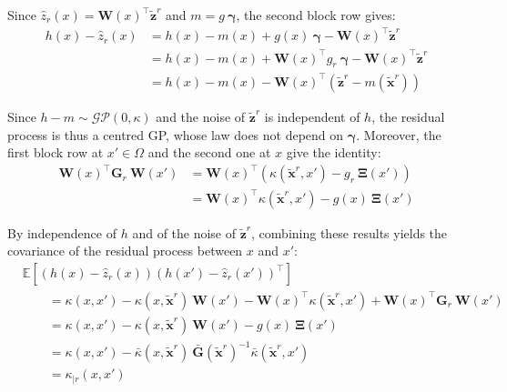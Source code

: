 Since $\hat{z}_r(x)=\mathbf{W}(x)^\top\tilde{\mathbf{z}}^r$ and $m=g\:\boldsymbol{\gamma}$, the second block row gives:
\begin{equation}
	\begin{aligned}
	h(x)-\hat{z}_r(x)&=h(x)-m(x)+g(x)\:\boldsymbol{\gamma}-\mathbf{W}(x)^\top\tilde{\mathbf{z}}^r\\
	&=h(x)-m(x)+\mathbf{W}(x)^\top g_r\:\boldsymbol{\gamma}-\mathbf{W}(x)^\top\tilde{\mathbf{z}}^r\\
	&=h(x)-m(x)-\mathbf{W}(x)^\top\left(\tilde{\mathbf{z}}^r-m(\tilde{\mathbf{x}}^r)\right)
	\end{aligned}
\end{equation}

Since $h-m\sim\mathcal{GP}(0,\kappa)$ and the noise of $\tilde{\mathbf{z}}^r$ is independent of $h$, the residual process is thus a centred GP, whose law does not depend on $\boldsymbol{\gamma}$. Moreover, the first block row at $x'\in\Omega$ and the second one at $x$ give the identity:
\begin{equation}
	\begin{aligned}
	\mathbf{W}(x)^\top \mathbf{G}_r\:\mathbf{W}(x')&=\mathbf{W}(x)^\top\left(\kappa(\tilde{\mathbf{x}}^r,x')-g_r\:\boldsymbol{\Xi}(x')\right)\\
	&=\mathbf{W}(x)^\top \kappa(\tilde{\mathbf{x}}^r,x')-g(x)\:\boldsymbol{\Xi}(x')
	\end{aligned}
\end{equation}

By independence of $h$ and of the noise of $\tilde{\mathbf{z}}^r$, combining these results yields the covariance of the residual process between $x$ and $x'$:
\begin{equation}
	\begin{aligned}
	&\mathbb{E}\left[\left(h(x)-\hat{z}_r(x)\right)\left(h(x')-\hat{z}_r(x')\right)^\top\right]\\
	&\qquad=\kappa(x,x')-\kappa(x,\tilde{\mathbf{x}}^r)\:\mathbf{W}(x')-\mathbf{W}(x)^\top \kappa(\tilde{\mathbf{x}}^r,x')+\mathbf{W}(x)^\top \mathbf{G}_r\:\mathbf{W}(x')\\
	&\qquad=\kappa(x,x')-\kappa(x,\tilde{\mathbf{x}}^r)\:\mathbf{W}(x')-g(x)\:\boldsymbol{\Xi}(x')\\
	&\qquad=\kappa(x,x')-\bar{\kappa}(x,\tilde{\mathbf{x}}^r)\:\bar{\mathbf{G}}(\tilde{\mathbf{x}}^r)^{-1}\bar{\kappa}(\tilde{\mathbf{x}}^r,x')\\
	&\qquad=\kappa_{|r}(x,x')
	\end{aligned}
\end{equation}

